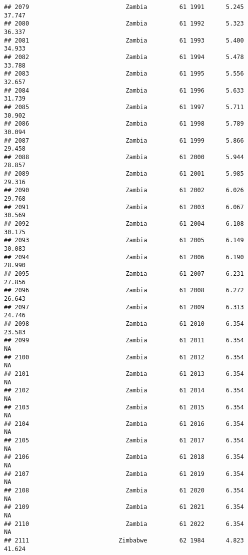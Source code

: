\documentclass[
]{article}
\begin{document}
\begin{verbatim}
## 2079                           Zambia         61 1991      5.245     37.747
## 2080                           Zambia         61 1992      5.323     36.337
## 2081                           Zambia         61 1993      5.400     34.933
## 2082                           Zambia         61 1994      5.478     33.788
## 2083                           Zambia         61 1995      5.556     32.657
## 2084                           Zambia         61 1996      5.633     31.739
## 2085                           Zambia         61 1997      5.711     30.902
## 2086                           Zambia         61 1998      5.789     30.094
## 2087                           Zambia         61 1999      5.866     29.458
## 2088                           Zambia         61 2000      5.944     28.857
## 2089                           Zambia         61 2001      5.985     29.316
## 2090                           Zambia         61 2002      6.026     29.768
## 2091                           Zambia         61 2003      6.067     30.569
## 2092                           Zambia         61 2004      6.108     30.175
## 2093                           Zambia         61 2005      6.149     30.083
## 2094                           Zambia         61 2006      6.190     28.990
## 2095                           Zambia         61 2007      6.231     27.856
## 2096                           Zambia         61 2008      6.272     26.643
## 2097                           Zambia         61 2009      6.313     24.746
## 2098                           Zambia         61 2010      6.354     23.583
## 2099                           Zambia         61 2011      6.354         NA
## 2100                           Zambia         61 2012      6.354         NA
## 2101                           Zambia         61 2013      6.354         NA
## 2102                           Zambia         61 2014      6.354         NA
## 2103                           Zambia         61 2015      6.354         NA
## 2104                           Zambia         61 2016      6.354         NA
## 2105                           Zambia         61 2017      6.354         NA
## 2106                           Zambia         61 2018      6.354         NA
## 2107                           Zambia         61 2019      6.354         NA
## 2108                           Zambia         61 2020      6.354         NA
## 2109                           Zambia         61 2021      6.354         NA
## 2110                           Zambia         61 2022      6.354         NA
## 2111                         Zimbabwe         62 1984      4.823     41.624

\end{verbatim}
\end{document}
